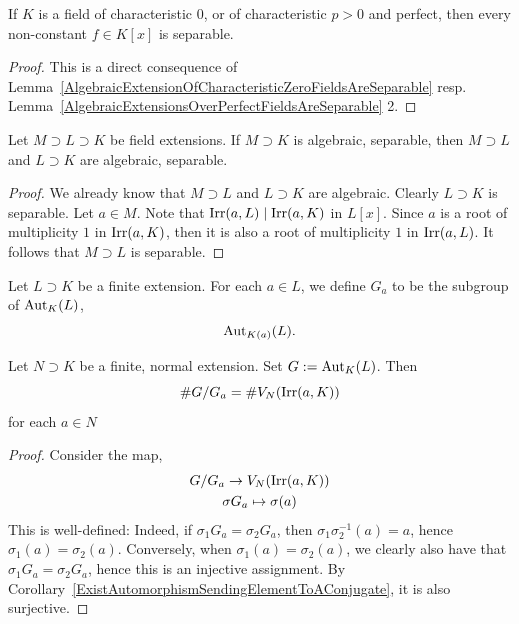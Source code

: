 \begin{lemma}
    If $K$ is a field of characteristic $0$, or of characteristic $p>0$ and perfect, then every non-constant $f\in K[x]$ is separable.  
\end{lemma}
\begin{proof}
    This is a direct consequence of Lemma~\ref{AlgebraicExtensionOfCharacteristicZeroFieldsAreSeparable} resp. Lemma~\ref{AlgebraicExtensionsOverPerfectFieldsAreSeparable} 2. 
\end{proof}

\begin{lemma}\label{SeparabilityOfIntermediateFieldsOfAlgebraicSeparableFields}
    Let $M\supset L \supset K$ be field extensions. If $M\supset K$ is algebraic, separable, then $M\supset L$ and $L\supset K$ are algebraic, separable.  
\end{lemma}
\begin{proof}
    We already know that $M\supset L$ and $L\supset K$ are algebraic. Clearly $L\supset K$ is separable. Let $a\in M$. Note that $\mathrm{Irr}(a,L)\mid \mathrm{Irr}(a,K)$ in $L[x]$. Since $a$ is a root of multiplicity $1$ in $\mathrm{Irr}(a,K)$, then it is also a root of multiplicity $1$ in $\mathrm{Irr}(a,L)$. It follows that $M\supset L$ is separable.
\end{proof}
\begin{definition}
    Let $L \supset K$ be a finite extension. For each $a\in L$, we define $G_a$ to be the subgroup of $\mathrm{Aut}_K(L)$, 
    $$
        \mathrm{Aut}_{K(a)}(L).
    $$ 
\end{definition}
\begin{lemma}
    Let $N\supset K$ be a finite, normal extension. Set $G := \mathrm{Aut}_K(L)$. Then 
    $$
        \# G/G_a = \#V_N(\mathrm{Irr}(a,K))
    $$
    for each $a\in N$
\end{lemma}
\begin{proof}
    Consider the map,
    \begin{gather*}
        G/G_a \rightarrow V_N(\mathrm{Irr}(a,K))\\
        \sigma G_a \mapsto \sigma(a)
    \end{gather*}
    This is well-defined: Indeed, if $\sigma_1  G_a = \sigma_2  G_a$, then $\sigma_1\sigma_2^{-1}(a) = a$, hence $\sigma_1(a)=\sigma_2(a)$. Conversely, when $\sigma_1(a) = \sigma_2(a)$, we clearly also have that $\sigma_1G_a = \sigma_2G_a$, hence this is an injective assignment. By Corollary~\ref{ExistAutomorphismSendingElementToAConjugate}, it is also surjective. 
\end{proof}

